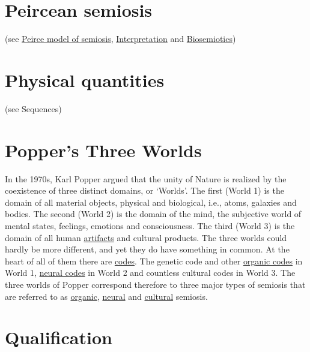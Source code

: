 \documentclass[12pt]{article}
\begin{document}
\hypertarget{peircean_semiosis}{}
\section{Peircean semiosis} (see \hyperlink{peirce_model_of_semiosis}{Peirce model of semiosis}, \hyperlink{interpretation}{Interpretation} and \hyperlink{biosemiotics}{Biosemiotics})


\hypertarget{physical_quantities}{}
\section{Physical quantities} (see Sequences)

\hypertarget{poppers_three_worlds}{}
\section{Popper's Three Worlds} 
In the 1970s, Karl Popper argued that the unity of Nature is realized by the coexistence of three distinct domains, or `Worlds'. The first (World 1) is the domain of all material objects, physical and biological, i.e., atoms, galaxies and bodies. The second (World 2) is the domain of the mind, the subjective world of mental states, feelings, emotions and consciousness. The third (World 3) is the domain of all human \hyperlink{artifacts}{artifacts} and cultural products. The three worlds could hardly be more different, and yet they do have something in common. At the heart of all of them there are \hyperlink{code}{codes}. The genetic code and other \hyperlink{organic_codes}{organic codes} in World 1, \hyperlink{neural_codes}{neural codes} in World 2 and countless cultural codes in World 3. The three worlds of Popper correspond therefore to three major types of semiosis that are referred to as \hyperlink{organic_semiosis}{organic}, \hyperlink{neural_semiosis}{neural} and \hyperlink{cultural_semiosis}{cultural} semiosis. 

\hypertarget{qualification}{}
\section{Qualification}

\hypertarget{quantities_qualities_nominables}{}
\end{document}
